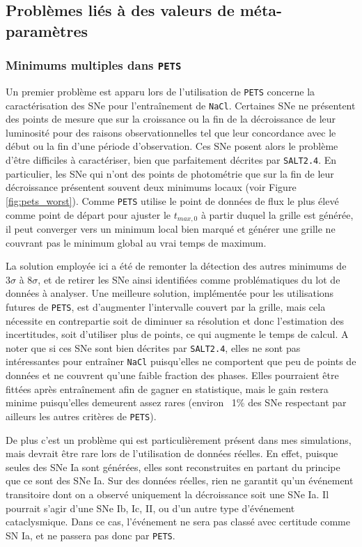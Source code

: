 \documentclass{book}
\def\pets{\texttt{PETS}\xspace}
\def\nacl{\texttt{NaCl}\xspace}
\def\saltd{\texttt{SALT2.4}\xspace}
\begin{document}
\subsection{Problèmes liés à des valeurs de méta-paramètres}

\subsubsection{Minimums multiples dans \pets}
\label{sec:min_mult}

Un premier problème est apparu lors de l'utilisation de \pets concerne la caractérisation des SNe pour l'entraînement de \nacl. Certaines SNe ne présentent des points de mesure que sur la croissance ou la fin de la décroissance de leur luminosité pour des raisons observationnelles tel que leur concordance avec le début ou la fin d'une période d'observation. Ces SNe posent alors le problème d'être difficiles à caractériser, bien que parfaitement décrites par \saltd. En particulier, les SNe qui n'ont des points de photométrie que sur la fin de leur décroissance présentent souvent deux minimums locaux (voir Figure \ref{fig:pets_worst}). Comme \pets utilise le point de données de flux le plus élevé comme point de départ pour ajuster le $t_{max, 0}$ à partir duquel la grille est générée, il peut converger vers un minimum local bien marqué et générer une grille ne couvrant pas le minimum global au vrai temps de maximum.

La solution employée ici a été de remonter la détection des autres minimums de $3\sigma$ à $8\sigma$, et de retirer les SNe ainsi identifiées comme problématiques du lot de données à analyser. Une meilleure solution, implémentée pour les utilisations futures de \pets, est d'augmenter l'intervalle couvert par la grille, mais cela nécessite en contrepartie soit de diminuer sa résolution et donc l'estimation des incertitudes, soit d'utiliser plus de points, ce qui augmente le temps de calcul. A noter que si ces SNe sont bien décrites par \saltd, elles ne sont pas intéressantes pour entraîner \nacl puisqu'elles ne comportent que peu de points de données et ne couvrent qu'une faible fraction des phases. Elles pourraient être fittées après entraînement afin de gagner en statistique, mais le gain restera minime puisqu'elles demeurent assez rares (environ ~1\% des SNe respectant par ailleurs les autres critères de \pets).

De plus c'est un problème qui est particulièrement présent dans mes simulations, mais devrait être rare lors de l'utilisation de données réelles. En effet, puisque seules des SNe Ia sont générées, elles sont reconstruites en partant du principe que ce sont des SNe Ia. Sur des données réelles, rien ne garantit qu'un événement transitoire dont on a observé uniquement la décroissance soit une SNe Ia. Il pourrait s'agir d'une SNe Ib, Ic, II, ou d'un autre type d'événement cataclysmique. Dans ce cas, l'événement ne sera pas classé avec certitude comme SN Ia, et ne passera pas donc par \pets.
\end{document}
